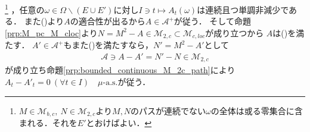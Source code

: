 \begin{prf}
\begin{description}
				\footnote{
					$M \in \mathcal{M}_{b,c},\ N \in \mathcal{M}_{2,c}$より$M,N$のパスが連続でない$\omega$の全体は或る零集合に含まれる．それを$E'$とおけばよい．
				}
				，任意の$\omega \in \Omega \backslash (E \cup E')$に対し$I \ni t \longmapsto A_t(\omega)$は連続且つ単調非減少である．
				また()より$A$の適合性が出るから$A \in \mathcal{A}^+$が従う．
				そして命題\ref{prp:M_pc_M_cloc}より$N = M^2 - A \in \mathcal{M}_{2,c} \subset \mathcal{M}_{c,loc}$が成り立つから
				$A$は()を満たす．
				$A' \in \mathcal{A}^+$もまた()を満たすなら，$N' = M^2 - A'$として
				\begin{align}
					\mathcal{A} \ni A - A' = N' - N \in \mathcal{M}_{2,c}
				\end{align}
				が成り立ち命題\ref{prp:bounded_continuous_M_2c_path}により$A_t - A'_t = 0\ (\forall t \in I)\quad \mbox{$\mu$-a.s.}$が従う．
				

\end{description}
\end{prf}
